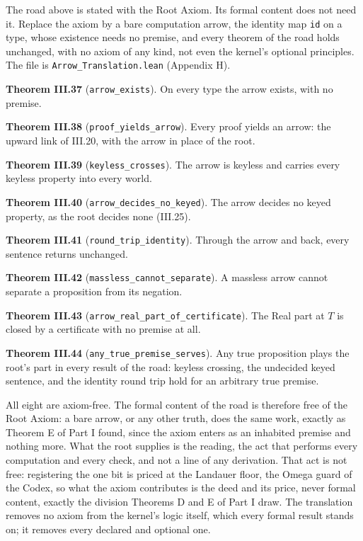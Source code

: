 \documentclass[10pt]{article}
\begin{document}
The road above is stated with the Root Axiom. Its formal content does
not need it. Replace the axiom by a bare computation arrow, the identity
map \texttt{id} on a type, whose existence needs no premise, and every
theorem of the road holds unchanged, with no axiom of any kind, not even
the kernel's optional principles. The file is
\texttt{Arrow\_Translation.lean} (Appendix H).

\textbf{Theorem III.37} (\texttt{arrow\_exists}). On every type the
arrow exists, with no premise.

\textbf{Theorem III.38} (\texttt{proof\_yields\_arrow}). Every proof
yields an arrow: the upward link of III.20, with the arrow in place of
the root.

\textbf{Theorem III.39} (\texttt{keyless\_crosses}). The arrow is
keyless and carries every keyless property into every world.

\textbf{Theorem III.40} (\texttt{arrow\_decides\_no\_keyed}). The arrow
decides no keyed property, as the root decides none (III.25).

\textbf{Theorem III.41} (\texttt{round\_trip\_identity}). Through the
arrow and back, every sentence returns unchanged.

\textbf{Theorem III.42} (\texttt{massless\_cannot\_separate}). A
massless arrow cannot separate a proposition from its negation.

\textbf{Theorem III.43} (\texttt{arrow\_real\_part\_of\_certificate}).
The Real part at \(T\) is closed by a certificate with no premise at
all.

\textbf{Theorem III.44} (\texttt{any\_true\_premise\_serves}). Any true
proposition plays the root's part in every result of the road: keyless
crossing, the undecided keyed sentence, and the identity round trip hold
for an arbitrary true premise.

All eight are axiom-free. The formal content of the road is therefore
free of the Root Axiom: a bare arrow, or any other truth, does the same
work, exactly as Theorem E of Part I found, since the axiom enters as an
inhabited premise and nothing more. What the root supplies is the
reading, the act that performs every computation and every check, and
not a line of any derivation. That act is not free: registering the one
bit is priced at the Landauer floor, the Omega guard of the Codex, so
what the axiom contributes is the deed and its price, never formal
content, exactly the division Theorems D and E of Part I draw. The
translation removes no axiom from the kernel's logic itself, which every
formal result stands on; it removes every declared and optional one.
\end{document}
